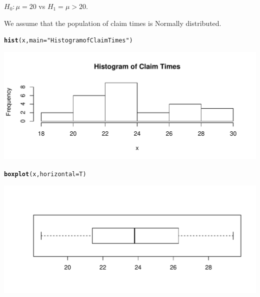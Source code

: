 \documentclass[t,xcolor=pdftex,dvipsnames,table]{beamer}\usepackage[]{graphicx}\usepackage[]{color}
\makeatletter
\def\maxwidth{ %
  \ifdim\Gin@nat@width>\linewidth
    \linewidth
  \else
    \Gin@nat@width
  \fi
}
\newcommand{\hlstr}[1]{\textcolor[rgb]{0.192,0.494,0.8}{#1}}%
\newcommand{\hlstd}[1]{\textcolor[rgb]{0.345,0.345,0.345}{#1}}%
\newcommand{\hlkwc}[1]{\textcolor[rgb]{0.333,0.667,0.333}{#1}}%
\newcommand{\hlkwd}[1]{\textcolor[rgb]{0.737,0.353,0.396}{\textbf{#1}}}%
\newenvironment{kframe}{%
 \def\at@end@of@kframe{}%
 \ifinner\ifhmode%
  \def\at@end@of@kframe{\end{minipage}}%
  \begin{minipage}{\columnwidth}%
 \fi\fi%
 \def\FrameCommand##1{\hskip\@totalleftmargin \hskip-\fboxsep
 \colorbox{shadecolor}{##1}\hskip-\fboxsep
     \hskip-\linewidth \hskip-\@totalleftmargin \hskip\columnwidth}%
 \MakeFramed {\advance\hsize-\width
   \@totalleftmargin\z@ \linewidth\hsize
   \@setminipage}}%
 {\par\unskip\endMakeFramed%
 \at@end@of@kframe}
\newenvironment{knitrout}{}{} %
\makeatother
\begin{document}
\begin{frame}[fragile]{}

$H_{0}: \mu = 20$ vs $H_{1} = \mu > 20$.

\vspace{.5cm}
 We assume that the population of claim times is Normally distributed.

\begin{knitrout}
\color{fgcolor}\begin{kframe}
\begin{alltt}
\hlkwd{hist}\hlstd{(x,}\hlkwc{main}\hlstd{=}\hlstr{"Histogram of Claim Times"}\hlstd{)}
\end{alltt}
\end{kframe}
\includegraphics[width=\maxwidth]{figure/unnamed-chunk-139-1} 

\end{knitrout}
\end{frame}  

\begin{frame}[fragile]{}

\begin{knitrout}
\color{fgcolor}\begin{kframe}
\begin{alltt}
\hlkwd{boxplot}\hlstd{(x,}\hlkwc{horizontal}\hlstd{=T)}
\end{alltt}
\end{kframe}
\includegraphics[width=\maxwidth]{figure/unnamed-chunk-140-1} 

\end{knitrout}
\end{frame}  
\end{document}
